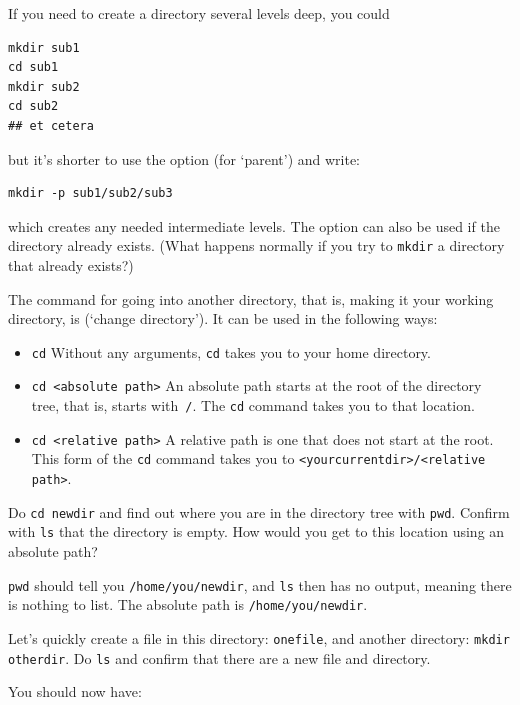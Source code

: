 If you need to create a directory several levels deep, you could
\begin{verbatim}
mkdir sub1
cd sub1
mkdir sub2
cd sub2
## et cetera
\end{verbatim}
but it's shorter to use the  option (for `parent') and write:
\begin{verbatim}
mkdir -p sub1/sub2/sub3
\end{verbatim}
which creates any needed intermediate levels.
The  option can also be used if the directory already exists.
(What happens normally if you try to \lstinline{mkdir} a directory
that already exists?)

The command for going into another directory, that is, making it your
working directory, is  (`change directory'). It can be used in
the following ways:
\begin{itemize}
\item \lstinline{cd} Without any arguments, \lstinline{cd} takes you to your home directory.
\item \lstinline{cd <absolute path>} An absolute path starts at the root of
  the directory tree, that is, starts with~\lstinline{/}. The \lstinline{cd} command
  takes you to that location.
\item \lstinline{cd <relative path>} A relative path is one that does not
  start at the root. This form of the \lstinline{cd} command takes you to
  \lstinline{<yourcurrentdir>/<relative path>}.
\end{itemize}

\begin{exercise}
  Do \lstinline{cd newdir} and find out where you are in the directory tree
  with \lstinline{pwd}.  Confirm with \lstinline{ls} that the directory is empty.  How
  would you get to this location using an absolute path?
\end{exercise}
\begin{outcome}
  \lstinline{pwd} should tell you \lstinline{/home/you/newdir}, and \lstinline{ls} then has no
  output, meaning there is nothing to list.  The absolute path is
  \lstinline{/home/you/newdir}.
\end{outcome}

\begin{exercise}
  Let's quickly create a file in this directory: 
  \lstinline{onefile}, and another directory: \lstinline{mkdir otherdir}.
  Do \lstinline{ls} and confirm that there are a new file and directory.
\end{exercise}
\begin{outcome}
  You should now have: 
\end{outcome}

